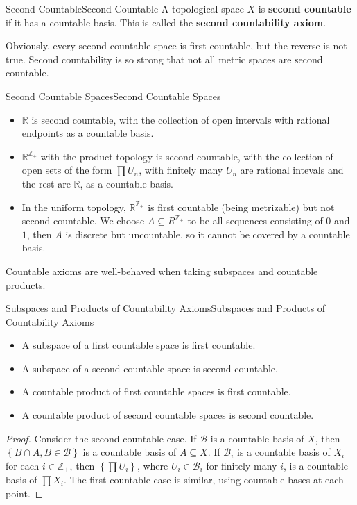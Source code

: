 \documentclass[../main.tex]{subfiles}
\begin{document}
\begin{definition}{Second Countable}{Second Countable}
	A topological space $X$ is \textbf{second countable} if it has a countable basis. This is called the \textbf{second countability axiom}.
\end{definition}

Obviously, every second countable space is first countable, but the reverse is not true. Second countability is so strong that not all metric spaces are second countable.

\begin{example}{Second Countable Spaces}{Second Countable Spaces}
	\begin{itemize}
	\item $\mathbb{R}$ is second countable, with the collection of open intervals with rational endpoints as a countable basis.
	\item $\mathbb{R}^{\mathbb{Z}_+}$ with the product topology is second countable, with the collection of open sets of the form $\prod U_n$, with finitely many $U_n$ are rational intevals and the rest are $\mathbb{R}$, as a countable basis.
	\item In the uniform topology, $\mathbb{R}^{\mathbb{Z}_+}$ is first countable (being metrizable) but not second countable. We choose $A \subseteq R^{\mathbb{Z}_+}$ to be all sequences consisting of $0$ and $1$, then $A$ is discrete but uncountable, so it cannot be covered by a countable basis.
	\end{itemize}
\end{example}

Countable axioms are well-behaved when taking subspaces and countable products.
\begin{theorem}{Subspaces and Products of Countability Axioms}{Subspaces and Products of Countability Axioms}
\begin{itemize}
\item A subspace of a first countable space is first countable.
\item A subspace of a second countable space is second countable.
\item A countable product of first countable spaces is first countable.
\item A countable product of second countable spaces is second countable.
\end{itemize}
\end{theorem}
\begin{proof}
	Consider the second countable case. If $\mathcal{B}$ is a countable basis of $X$, then $\left\{ B\cap A, B\in \mathcal{B} \right\}$ is a countable basis of $A \subseteq X$. If $\mathcal{B}_i$ is a countable basis of $X_i$ for each $i\in \mathbb{Z}_+$, then $\left\{ \prod U_i \right\}$, where $U_i \in \mathcal{B}_i$ for finitely many $i$, is a countable basis of $\prod X_i$.
	The first countable case is similar, using countable bases at each point.
\end{proof}
\end{document}
